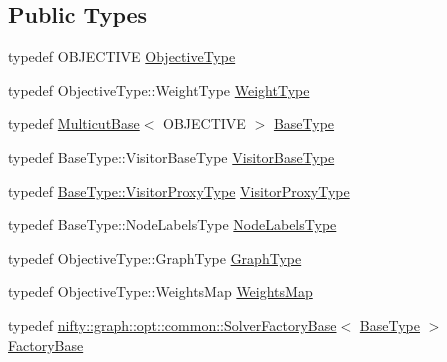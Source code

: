 \subsection*{Public Types}
\begin{DoxyCompactItemize}
\item 
typedef O\+B\+J\+E\+C\+T\+I\+VE \hyperlink{classnifty_1_1graph_1_1opt_1_1multicut_1_1MulticutDecomposer_ab70024cf8bdd7baea7842c33de022ffd}{Objective\+Type}
\item 
typedef Objective\+Type\+::\+Weight\+Type \hyperlink{classnifty_1_1graph_1_1opt_1_1multicut_1_1MulticutDecomposer_a9507b924e75719283340e9ddbf830b27}{Weight\+Type}
\item 
typedef \hyperlink{classnifty_1_1graph_1_1opt_1_1multicut_1_1MulticutBase}{Multicut\+Base}$<$ O\+B\+J\+E\+C\+T\+I\+VE $>$ \hyperlink{classnifty_1_1graph_1_1opt_1_1multicut_1_1MulticutDecomposer_add2ab66a4e322e5cf9b105e12d09f2f1}{Base\+Type}
\item 
typedef Base\+Type\+::\+Visitor\+Base\+Type \hyperlink{classnifty_1_1graph_1_1opt_1_1multicut_1_1MulticutDecomposer_aa922f216a5bf815efc8b3926d417ef67}{Visitor\+Base\+Type}
\item 
typedef \hyperlink{classnifty_1_1graph_1_1opt_1_1common_1_1SolverBase_ad209b469b3bc9fc0fc14e9fed4d09075}{Base\+Type\+::\+Visitor\+Proxy\+Type} \hyperlink{classnifty_1_1graph_1_1opt_1_1multicut_1_1MulticutDecomposer_a5d8e8a7b32ca991c452efbf46e5271f2}{Visitor\+Proxy\+Type}
\item 
typedef Base\+Type\+::\+Node\+Labels\+Type \hyperlink{classnifty_1_1graph_1_1opt_1_1multicut_1_1MulticutDecomposer_a69684cd6ab2be276e72622e0fdedca33}{Node\+Labels\+Type}
\item 
typedef Objective\+Type\+::\+Graph\+Type \hyperlink{classnifty_1_1graph_1_1opt_1_1multicut_1_1MulticutDecomposer_adde5b8379b619de316e6e8faa09960d8}{Graph\+Type}
\item 
typedef Objective\+Type\+::\+Weights\+Map \hyperlink{classnifty_1_1graph_1_1opt_1_1multicut_1_1MulticutDecomposer_a9834b97c23c60efe89b26261fc033a75}{Weights\+Map}
\item 
typedef \hyperlink{classnifty_1_1graph_1_1opt_1_1common_1_1SolverFactoryBase}{nifty\+::graph\+::opt\+::common\+::\+Solver\+Factory\+Base}$<$ \hyperlink{classnifty_1_1graph_1_1opt_1_1multicut_1_1MulticutDecomposer_add2ab66a4e322e5cf9b105e12d09f2f1}{Base\+Type} $>$ \hyperlink{classnifty_1_1graph_1_1opt_1_1multicut_1_1MulticutDecomposer_a0fb13bd2e6a0c561ae55b31deab53639}{Factory\+Base}
\item 

\end{DoxyCompactItemize}
